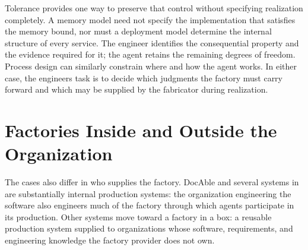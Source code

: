 
Tolerance provides one way to preserve that control without specifying realization completely. A memory model need not specify the implementation that satisfies the memory bound, nor must a deployment model determine the internal structure of every service. The engineer identifies the consequential property and the evidence required for it; the agent retains the remaining degrees of freedom. Process design can similarly constrain where and how the agent works. In either case, the engineer\textquotesingle s task is to decide which judgments the factory must carry forward and which may be supplied by the fabricator during realization.

\section{Factories Inside and Outside the Organization}\label{heading:factories-inside-and-outside-the-organization}


The cases also differ in who supplies the factory. DocAble and several systems in  are substantially internal production systems: the organization engineering the software also engineers much of the factory through which agents participate in its production. Other systems move toward a factory in a box: a reusable production system supplied to organizations whose software, requirements, and engineering knowledge the factory provider does not own.


